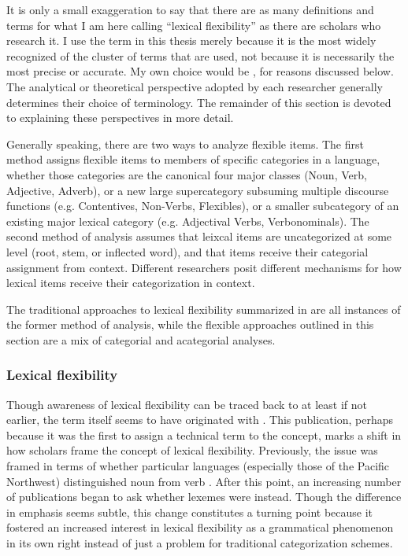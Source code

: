 It is only a small exaggeration to say that there are as many definitions and terms for what I am here calling \enquote{lexical flexibility} as there are scholars who research it. I use the term  in this thesis merely because it is the most widely recognized of the cluster of terms that are used, not because it is necessarily the most precise or accurate. My own choice would be , for reasons discussed below. The analytical or theoretical perspective adopted by each researcher generally determines their choice of terminology. The remainder of this section is devoted to explaining these perspectives in more detail.

Generally speaking, there are two ways to analyze flexible items. The first method assigns flexible items to members of specific categories in a language, whether those categories are the canonical four major classes (Noun, Verb, Adjective, Adverb), or a new large supercategory subsuming multiple discourse functions (e.g. Contentives, Non-Verbs, Flexibles), or a smaller subcategory of an existing major lexical category (e.g. Adjectival Verbs, Verbonominals). The second method of analysis assumes that leixcal items are uncategorized at some level (root, stem, or inflected word), and that items receive their categorial assignment from context. Different researchers posit different mechanisms for how lexical items receive their categorization in context.

The traditional approaches to lexical flexibility summarized in  are all instances of the former method of analysis, while the flexible approaches outlined in this section are a mix of categorial and acategorial analyses.

\subsubsection{Lexical flexibility}
\label{sec:2.3.1.1}

Though awareness of lexical flexibility can be traced back to at least \textcite[174--177]{Gallatin1836} if not earlier, the term  itself seems to have originated with \textcite[Ch.~4]{Hengeveld1992}. This publication, perhaps because it was the first to assign a technical term to the concept, marks a shift in how scholars frame the concept of lexical flexibility. Previously, the issue was framed in terms of whether particular languages (especially those of the Pacific Northwest) distinguished noun from verb \parencites{Kuipers1968}{Jacobsen1979}{Hebert1983}{Kinkade1983}{EijkHess1986}{JelinekDemers1994}. After this point, an increasing number of publications began to ask whether lexemes were  instead. Though the difference in emphasis seems subtle, this change constitutes a turning point because it fostered an increased interest in lexical flexibility as a grammatical phenomenon in its own right instead of just a problem for traditional categorization schemes.

